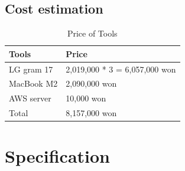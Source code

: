 \documentclass[conference]{IEEEtran}
\begin{document}
\subsection{Cost estimation}
\begin{table}[h]
\caption{Price of Tools}
\def\arraystretch{1.25} \small
    \begin{tabular}{|p{2.4cm}|p{5.0cm}|}
	\hline
	Tools & Price\\
       \hline
       LG gram 17 & 2,019,000 * 3 = 6,057,000 won\\
	\hline
       MacBook M2 & 2,090,000 won\\
	\hline
       AWS server & 10,000 won\\
	\hline
	Total & 8,157,000 won\\
	\hline
	\end{tabular}
\end{table}
\section{Specification}
\end{document}

